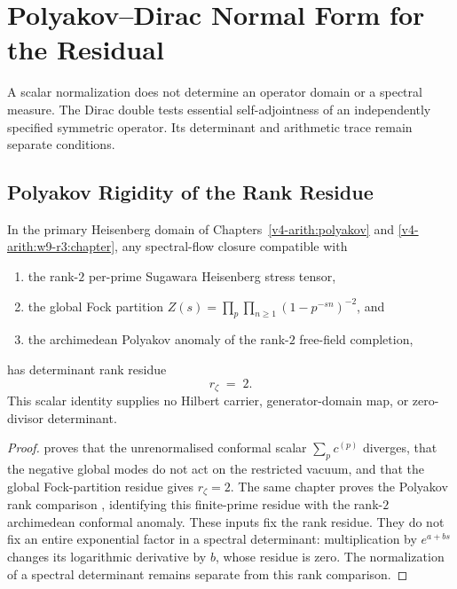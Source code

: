 \section{Polyakov--Dirac Normal Form for the Residual}
\label{v4-arith:w9-r4:polyakov-dirac-normal-form}

A scalar normalization does not determine an operator domain or
a spectral measure. The Dirac double tests essential self-adjointness
of an independently specified symmetric operator. Its determinant
and arithmetic trace remain separate conditions.

\subsection{Polyakov Rigidity of the Rank Residue}
\label{v4-arith:w9-r4:pdnf:polyakov}

\begin{proposition}
\label{v4-arith:w9-r4:prop:polyakov-scalar-rigidity}
\ClaimStatusProvedHere In the primary Heisenberg domain of
Chapters~\ref{v4-arith:polyakov} and
\ref{v4-arith:w9-r3:chapter}, any spectral-flow closure compatible
with
\begin{enumerate}
\item the rank-\(2\) per-prime Sugawara Heisenberg stress tensor,
\item the global Fock partition
\(Z(s)=\prod_{p}\prod_{n\geq 1}(1-p^{-sn})^{-2}\), and
\item the archimedean Polyakov anomaly of the rank-\(2\) free-field
completion,
\end{enumerate}
has determinant rank residue
\begin{equation}
\label{v4-arith:w9-r4:eq:polyakov-rigid-c}
r_{\zeta}\;=\;2.
\end{equation}
This scalar identity supplies no Hilbert carrier, generator-domain
map, or zero-divisor determinant.
\end{proposition}

\begin{proof}
 proves that the unrenormalised conformal scalar
\(\sum_{p}c^{(p)}\) diverges, that the negative global modes do not act
on the restricted vacuum, and that the global Fock-partition residue
gives \(r_{\zeta}=2\). The same chapter proves the Polyakov
rank comparison
, identifying this
finite-prime residue with the rank-\(2\) archimedean conformal
anomaly. These inputs fix the rank residue. They do not fix an
entire exponential factor in a spectral determinant:
multiplication by \(e^{a+bs}\) changes its logarithmic derivative
by \(b\), whose residue is zero. The normalization of a spectral
determinant remains separate from this rank comparison.
\end{proof}

